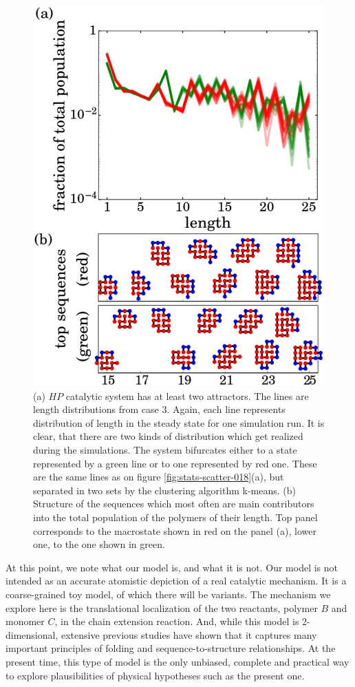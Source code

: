 \documentclass[twocolumn,letterpaper]{revtex4-1}
\begin{document}
\begin{figure}[ht!]
  \centering
  \includegraphics[width=0.9\columnwidth]{pictures/distr-1837-dynamics.eps}
  \caption{\footnotesize{\textbf{} (a) $HP$ catalytic system has 
at least two attractors. The lines are length distributions from case 3. Again, 
each line represents distribution of length in the steady state for one simulation run. It is 
clear, that there are two kinds of distribution which get realized during the simulations. 
The system 
bifurcates either to a state represented by a green line or to one represented by red one. These 
are the same lines as on figure \ref{fig:stats-scatter-018}(a), but separated in two sets by the 
clustering algorithm k-means. (b) Structure of the sequences which most often
are main contributors into the total population of the polymers of their length. Top panel 
corresponds to the macrostate shown in red on the panel (a), lower one, to the one shown in green. 
}}
  \label{fig:distr1837-dyn}
\end{figure}


At this point, we note what our model is, and what it is not.  Our model is not intended as an 
 accurate atomistic depiction of a real catalytic mechanism.  It is a coarse-grained toy model, of 
which there will be variants.  The mechanism we explore here is the translational localization of 
the two reactants, polymer $B$ and monomer $C$, in the chain extension reaction.  And, while this 
model is 2-dimensional, extensive previous studies have shown that it captures many important 
principles of folding and sequence-to-structure relationships.  At the present time, this type of 
model is the only unbiased, complete and practical way to explore plausibilities of physical 
hypotheses such as the present one.
\end{document}

